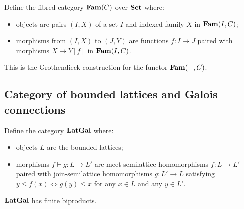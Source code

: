 Define the fibred category $\mathbf{Fam}(C)$ over $\mathbf{Set}$ where:
\begin{itemize}
\item objects are pairs $(I, X)$ of a set $I$ and indexed family $X$ in $\mathbf{Fam}(I,C)$;
\item morphisms from $(I, X)$ to $(J, Y)$ are functions $f: I \to J$ paired with morphisms $X \to Y[f]$ in
$\mathbf{Fam}(I,C)$.
\end{itemize}

\noindent This is the Grothendieck construction for the functor $\mathbf{Fam}(-,C)$.


\subsection{Category of bounded lattices and Galois connections}

Define the category $\mathbf{LatGal}$ where:
\begin{itemize}
\item objects $L$ are the bounded lattices;
\item morphisms $f \vdash g: L \to L'$ are meet-semilattice homomorphisms $f: L \to L'$ paired with
join-semilattice homomorphisms $g: L' \to L$ satisfying $y \leq f(x) \iff g(y) \leq x$ for any $x \in L$ and any
$y \in L'$.
\end{itemize}

\noindent $\mathbf{LatGal}$ has finite biproducts. 

